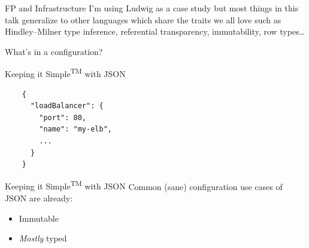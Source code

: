 \documentclass[aspectratio=169,20pt]{beamer}
\newcommand{\vspaced}{
    \vspace{5mm}
}
\newcommand{\chapterslide}[1]{
    {
        \begin{frame}[plain]
        \begin{center}
        \large{#1}
        \end{center}
        \end{frame}
    }
}
\begin{document}
\begin{frame}{FP and Infrastructure}
    I'm using Ludwig as a case study but most things in this talk generalize to
    other languages which share the traits we all love such as Hindley–Milner
    type inference, referential transparency, immutability, row types\ldots
\end{frame}

\chapterslide{What's in a configuration?}

\begin{frame}[fragile]{Keeping it Simple\textsuperscript{\tiny{TM}} with JSON}
    \begin{lstlisting}
    {
      "loadBalancer": {
        "port": 80,
        "name": "my-elb",
        ...
      }
    }
    \end{lstlisting}
\end{frame}

\begin{frame}{Keeping it Simple\textsuperscript{\tiny{TM}} with JSON}
    Common (sane) configuration use cases of JSON are already: \\
    \vspaced
    \begin{itemize}
    \item Immutable
    \item \emph{Mostly} typed
    \end{itemize}
    \vspaced
\end{frame}
\end{document}
